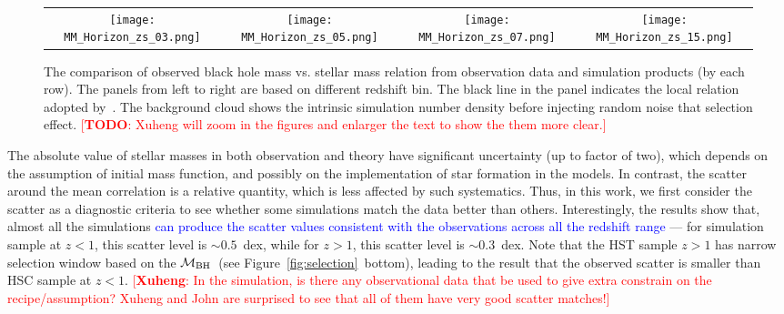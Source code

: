 \documentclass[twocolumn]{aastex631}
\newcommand{\todo}[1]{\textcolor{red}{[{\bf TODO}: #1]}}
\newcommand{\ding}[1]{\textcolor{red}{[{\bf Xuheng}: #1]}}
\newcommand{\blue}[1]{\textcolor{blue}{#1}}
\def\mbh{$\mathcal M_{\rm BH}$}
\begin{document}
\begin{figure*}
\begin{tabular}{c c c c}
\vspace*{-0.1cm} 
{\texttt{[image: MM\_Horizon\_zs\_03.png]}}&
\hspace*{-0.5cm} 
{\texttt{[image: MM\_Horizon\_zs\_05.png]}}&
\hspace*{-0.5cm} 
{\texttt{[image: MM\_Horizon\_zs\_07.png]}}&
\hspace*{-0.5cm} 
{\texttt{[image: MM\_Horizon\_zs\_15.png]}}\\
\end{tabular}
\caption{\label{fig:comparsion} 
The comparison of observed black hole mass vs. stellar mass relation from observation data and simulation products (by each row). The panels from left to right are based on different redshift bin. The black line in the panel indicates the local relation adopted by~\citet{Ding2020}. The background cloud shows the intrinsic simulation number density before injecting random noise that selection effect.
\todo{Xuheng will zoom in the figures and enlarger the text to show the them more clear.}
}
\end{figure*} 

The absolute value of stellar masses in both observation and theory have significant uncertainty (up to factor of two), which depends on the assumption of initial mass function, and possibly on the implementation of star formation in the models. In contrast, the scatter around the mean correlation is a relative quantity, which is less affected by such systematics. Thus, in this work, we first consider the scatter as a diagnostic criteria to see whether some simulations match the data better than others. Interestingly, the results show that, almost all the simulations \blue{can produce the scatter values consistent with the observations across all the redshift range} --- for simulation sample at $z<1$, this scatter level is $\sim0.5$~dex, while for $z>1$, this scatter level is $\sim0.3$~dex. Note that the HST sample $z>1$ has narrow selection window based on the \mbh\ (see Figure~\ref{fig:selection}~bottom), leading to the result that the observed scatter is smaller than HSC sample at $z<1$.
\ding{In the simulation, is there any observational data that be used to give extra constrain on the recipe/assumption? Xuheng and John are surprised to see that all of them have very good scatter matches!}
\end{document}
